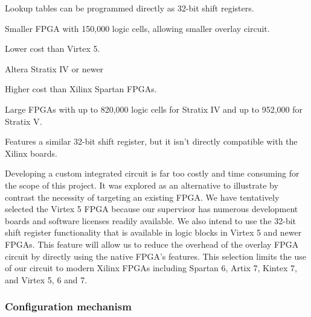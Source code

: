 \begin{enumeration}
\begin{itemlist}
\begin{enumeration}
\begin{itemlist}
					\item Lookup tables can be programmed directly as 32-bit shift registers.
					\item Smaller FPGA with 150,000 logic cells\cite{xilinx-models}, allowing smaller overlay circuit.
					\item Lower cost than Virtex 5.
				\end{itemlist}
			\item Altera Stratix IV or newer
				\begin{itemlist}
					\item Higher cost than Xilinx Spartan FPGAs.
					\item Large FPGAs with up to 820,000 logic cells for Stratix IV\cite{altera-stratix4} and up to 952,000 for Stratix V\cite{altera-stratix5}.
					\item Features a similar 32-bit shift register, but it isn't directly compatible with the Xilinx boards.
				\end{itemlist}
		\end{enumeration}
	\end{itemlist}
\end{enumeration}

Developing a custom integrated circuit is far too costly and time consuming for the scope of this project.
It was explored as an alternative to illustrate by contrast the necessity of targeting an existing FPGA.
We have tentatively selected the Virtex 5 FPGA because our supervisor has numerous development boards and software licenses readily available.
We also intend to use the 32-bit shift register functionality that is available in logic blocks in Virtex 5 and newer FPGAs.
This feature will allow us to reduce the overhead of the overlay FPGA circuit by directly using the native FPGA's features.
This selection limits the use of our circuit to modern Xilinx FPGAs including Spartan 6, Artix 7, Kintex 7, and Virtex 5, 6 and 7.



\subsubsection{Configuration mechanism}

